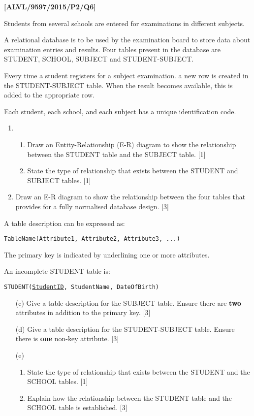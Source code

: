 \item \textbf{{[}ALVL/9597/2015/P2/Q6{]} }

Students from several schools are entered for examinations in different
subjects. 

A relational database is to be used by the examination board to store
data about examination entries and results. Four tables present in
the database are STUDENT, SCHOOL, SUBJECT and STUDENT-SUBJECT.

Every time a student registers for a subject examination. a new row
is created in the STUDENT-SUBJECT table. When the result becomes available,
this is added to the appropriate row.

Each student, each school, and each subject has a unique identification
code.
\begin{enumerate}
\item {}
\begin{enumerate}
\item Draw an Entity-Relationship (E-R) diagram to show the relationship
between the STUDENT table and the SUBJECT table. \hfill{}{[}1{]}
\item State the type of relationship that exists between the STUDENT and
SUBJECT tables. \hfill{}{[}1{]}
\end{enumerate}
\item Draw an E-R diagram to show the relationship between the four tables
that provides for a fully normalised database design.\hfill{} {[}3{]}
\end{enumerate}
A table description can be expressed as: 

\texttt{TableName(Attribute1, Attribute2, Attribute3, ...)} 

The primary key is indicated by underlining one or more attributes. 

An incomplete STUDENT table is: 

\texttt{STUDENT(}\texttt{\uline{StudentID}}\texttt{, StudentName,
DateOfBirth) }
\begin{enumerate}
\item[(c)]  Give a table description for the SUBJECT table. Ensure there are
\textbf{two} attributes in addition to the primary key. \hfill{}{[}3{]}
\item[(d)]  Give a table description for the STUDENT-SUBJECT table. Ensure there
is \textbf{one} non-key attribute.\hfill{} {[}3{]}
\item[(e)] {} 
\begin{enumerate}
\item State the type of relationship that exists between the STUDENT and
the SCHOOL tables.\hfill{} {[}1{]}
\item Explain how the relationship between the STUDENT table and the SCHOOL
table is established. \hfill{}{[}3{]}
\end{enumerate}
\end{enumerate}